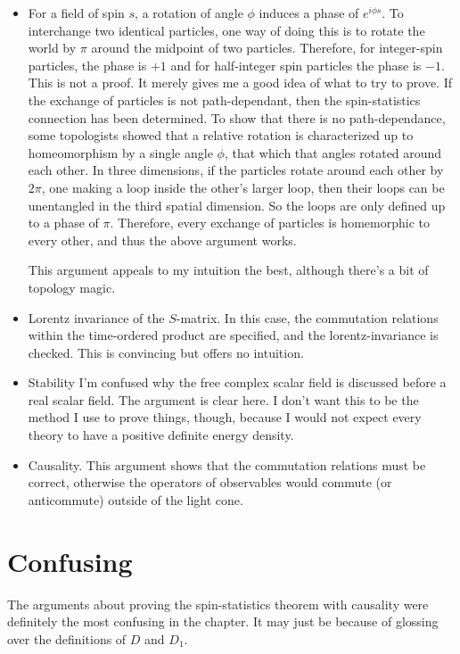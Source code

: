 \documentclass{article}
\begin{document}
\begin{itemize}
\item For a field of spin $s$, a rotation of angle $\phi$ induces a 
	phase of $e^{i \phi s}$.
To interchange two identical particles, one way of doing this is
	to rotate the world by $\pi$ around the midpoint of two particles.
Therefore, for integer-spin particles, the phase is $+ 1$ and for
	half-integer spin particles the phase is $- 1$.
This is not a proof.
It merely gives me a good idea of what to try to prove.
If the exchange of particles is not path-dependant, then the spin-statistics
	connection has been determined.
To show that there is no path-dependance, some topologists
	showed that a relative rotation is characterized up to homeomorphism
	by a single angle $\phi$, that which that angles rotated around each other.
In three dimensions, if the particles rotate around each other by $2 \pi$,
	one making a loop inside the other's larger loop, then their loops can
	be unentangled in the third spatial dimension.
So the loops are only defined up to a phase of $\pi$.
Therefore, every exchange of particles is homemorphic to every other, 
	and thus the above argument works.

This argument appeals to my intuition the best, although
	there's a bit of topology magic.
\item Lorentz invariance of the $S$-matrix.
In this case, the commutation relations within the time-ordered product are
	specified, and the lorentz-invariance is checked.
This is convincing but offers no intuition.
\item Stability
I'm confused why the free complex scalar field is discussed before a real
	scalar field.
The argument is clear here.
I don't want this to be the method I use to prove things, though,
	because I would not expect every theory to have a positive definite
	energy density.
\item Causality.
This argument shows that the commutation relations must be correct, otherwise
	the operators of observables would commute (or anticommute) outside
	of the light cone.
\end{itemize}

\section{Confusing}

The arguments about proving the spin-statistics theorem with causality were
	definitely the most confusing in the chapter.
It may just be because of glossing over the definitions of $D$ and $D_1$.
\end{document}
